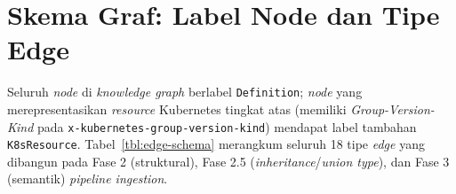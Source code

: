

\section{Skema Graf: Label Node dan Tipe Edge}

\begin{sloppypar}
Seluruh \textit{node} di \textit{knowledge graph} berlabel \texttt{Definition}; \textit{node} yang merepresentasikan \textit{resource} Kubernetes tingkat atas (memiliki \textit{Group-\allowbreak{}Version-\allowbreak{}Kind} pada \texttt{x-kubernetes-group-\allowbreak version-kind}) mendapat label tambahan \texttt{K8sResource}. Tabel~\ref{tbl:edge-schema} merangkum seluruh 18 tipe \textit{edge} yang dibangun pada Fase 2 (struktural), Fase 2.5 (\textit{inheritance}/\textit{union type}), dan Fase 3 (semantik) \textit{pipeline ingestion}.
\end{sloppypar}

